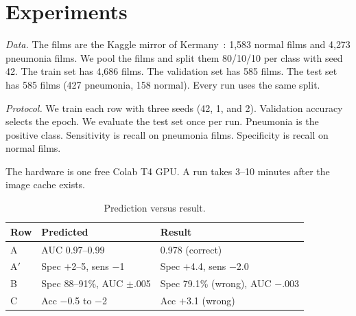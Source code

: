 \documentclass[conference]{IEEEtran}
\begin{document}
\section{Experiments}
\textit{Data.} The films are the Kaggle mirror of Kermany~\cite{kermany2018}: 1{,}583 normal films and 4{,}273 pneumonia films. We pool the films and split them 80/10/10 per class with seed 42. The train set has 4{,}686 films. The validation set has 585 films. The test set has 585 films (427 pneumonia, 158 normal). Every run uses the same split.

\textit{Protocol.} We train each row with three seeds (42, 1, and 2). Validation accuracy selects the epoch. We evaluate the test set once per run. Pneumonia is the positive class. Sensitivity is recall on pneumonia films. Specificity is recall on normal films.

The hardware is one free Colab T4 GPU. A run takes 3--10 minutes after the image cache exists.

\begin{table}[t]
\caption{Test results, mean $\pm$ std over three seeds. FP and FN are mean counts out of 158 normal films and 427 pneumonia films.}
\label{tab:ablation}
\centering
\footnotesize
\setlength{\tabcolsep}{3pt}
\end{table}

\begin{table}[t]
\caption{Prediction versus result.}
\label{tab:pred}
\centering
\footnotesize
\begin{tabular}{@{}lll@{}}
\toprule
Row & Predicted & Result \\
\midrule
A & AUC 0.97--0.99 & 0.978 (correct) \\
A$'$ & Spec $+$2--5, sens $-$1 & Spec $+$4.4, sens $-$2.0 \\
B & Spec 88--91\%, AUC $\pm$.005 & Spec 79.1\% (wrong), AUC $-$.003 \\
C & Acc $-$0.5 to $-$2 & Acc $+$3.1 (wrong) \\
\bottomrule
\end{tabular}
\end{table}
\end{document}
